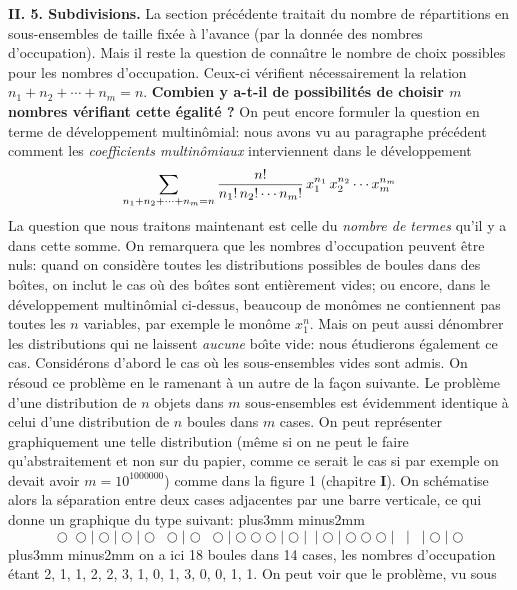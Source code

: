 \bigskip 
 
{\bf II. 5.  Subdivisions.} 
\medskip 
La section pr\'ec\'edente traitait du nombre de r\'epartitions en 
sous-ensembles de taille fix\'ee \`a l'avance (par la donn\'ee des  
nombres d'oc\-cu\-pa\-tion). Mais il reste la question de conna\^\i tre 
le nombre  de choix possibles pour les nombres d'occupation. Ceux-ci 
v\'erifient  n\'ecessairement la relation $n_1 + n_2 + \cdots + n_m = n$. 
{\bf Combien  y a-t-il de possibilit\'es de choisir $m$ nombres 
v\'erifiant cette \'egalit\'e ?} On peut encore formuler la question en 
terme de d\'eveloppement multin\^omial: nous avons vu au paragraphe 
pr\'ec\'edent comment les {\it coefficients multin\^omiaux} 
interviennent dans le d\'eveloppement 
$$\sum_{n_1+n_2+ \cdots +n_m=n}  {n! \over n_1!\,  n_2! \cdots n_m!}\, 
x_1^{n_1}\, x_2^{n_2} \cdots  x_m^{n_m} $$  
La question que nous traitons maintenant est celle du {\it nombre de 
termes} qu'il y a dans cette somme. On remarquera que les nombres 
d'occupation peuvent \^etre nuls: quand on consid\`ere toutes les  
distributions possibles de boules dans des bo\^\i tes, on inclut le cas  
o\`u des bo\^\i tes sont enti\`erement vides; ou encore, dans le  
d\'eveloppement multin\^omial ci-dessus, beaucoup de mon\^omes ne 
contiennent pas toutes les $n$ variables, par exemple le mon\^ome 
$x_1^n$. Mais on peut aussi d\'enombrer les distributions qui ne laissent 
{\it aucune} bo\^\i te vide: nous \'etudierons \'egalement ce cas.  
\medskip  
Consid\'erons d'abord le cas o\`u les sous-ensembles vides sont admis.  
On r\'esoud ce probl\`eme en le ramenant \`a un autre de la fa\c con 
suivante. Le probl\`eme d'une distribution de $n$ objets dans $m$ 
sous-ensembles est \'evidemment identique \`a celui d'une distribution 
de $n$ boules dans $m$ cases. On peut repr\'esenter graphiquement une 
telle distribution (m\^eme  si on ne peut le faire qu'abstraitement et 
non sur du papier, comme ce serait le cas si par exemple on devait avoir 
$m=10^{1000000}$) comme dans la figure 1 (chapitre {\bf I}). On 
sch\'ematise alors la s\'eparation entre deux cases adjacentes par une 
barre verticale, ce qui donne un graphique du type suivant: \vskip0mm plus3mm minus2mm
$$\bigcirc\;\bigcirc\mid\bigcirc\mid\bigcirc\mid\bigcirc\;\bigcirc 
\mid\bigcirc\;\bigcirc\mid\bigcirc\bigcirc\bigcirc\mid\bigcirc  
\mid\;\mid\bigcirc\mid\bigcirc\bigcirc\bigcirc\mid\;\mid 
\;\mid\bigcirc \mid\bigcirc$$ 
\vskip4mm plus3mm minus2mm
\noindent on a ici 18 boules dans 14 cases, les nombres d'occupation \'etant 2, 1,  
1,  2, 2, 3, 1, 0, 1, 3, 0, 0, 1, 1. On peut voir que le probl\`eme, vu sous 
